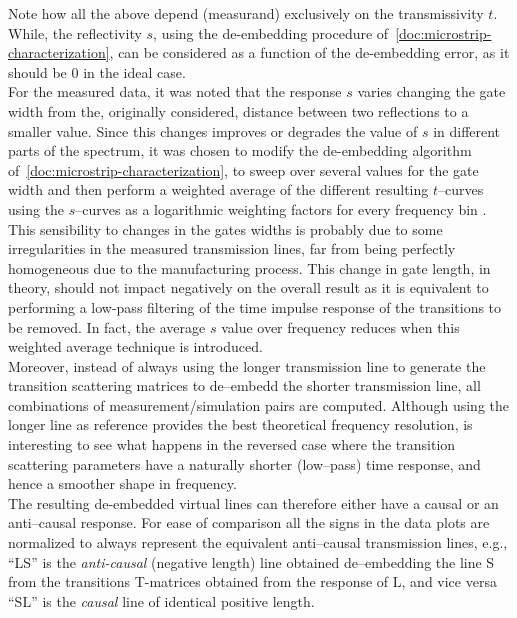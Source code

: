 \documentclass[11pt,a4paper]{article}
\newcommand{\laser}[1]{``#1''}
\begin{document}
    Note how all the above depend (measurand) exclusively on the transmissivity $t$.
    While, the reflectivity $s$, using the de-embedding procedure of~\ref{doc:microstrip-characterization}, can be
    considered as a function of the de-embedding error, as it should be 0 in the ideal case. \\
    For the measured data, it was noted that the response $s$ varies changing the gate width from the, originally considered, distance between
    two reflections to a smaller value.
    Since this changes improves or degrades the value of $s$ in different parts of the spectrum, it was chosen to modify
    the de-embedding algorithm of~\ref{doc:microstrip-characterization}, to sweep over several values for the gate width
    and then perform a weighted average of the different resulting $t$--curves using the $s$--curves as a logarithmic
    weighting factors for every frequency bin .\\
    This sensibility to changes in the gates widths is probably due to some irregularities in the measured transmission lines,
    far from being perfectly homogeneous due to the manufacturing process.
    This change in gate length, in theory, should not impact negatively on the overall result as it is equivalent to
    performing a low-pass filtering of the time impulse response of the transitions to be removed.
    In fact, the average $s$ value over frequency reduces when this weighted average technique is introduced. \\
    Moreover, instead of always using the longer transmission line to generate the transition scattering matrices to de--embedd the
    shorter transmission line, all combinations of measurement/simulation pairs are computed.
    Although using the longer line as reference provides the best theoretical frequency resolution, is interesting to see
    what happens in the reversed case where the transition scattering parameters have a naturally shorter (low--pass)
    time response, and hence a smoother shape in frequency.\\
    The resulting de-embedded virtual lines can therefore either have a causal or an anti--causal response.
    For ease of comparison all the signs in the data plots are normalized to always represent the equivalent anti--causal
    transmission lines, e.g., \laser{LS} is the \emph{anti-causal} (negative length) line obtained de--embedding the line S from the transitions
    T-matrices obtained from the response of L, and vice versa \laser{SL} is the \emph{causal} line of identical positive length.
\end{document}
